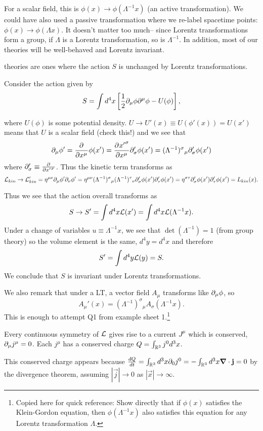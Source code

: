 For a scalar field, this is $\phi(x)\to \phi(\Lambda^{-1}x)$ (an active transformation). We could have also used a passive transformation where we re-label spacetime points: $\phi(x)\to \phi(\Lambda x)$. It doesn't matter too much-- since Lorentz transformations form a group, if $\Lambda$ is a Lorentz transformation, so is $\Lambda^{-1}$. In addition, most of our theories will be well-behaved and Lorentz invariant.

\begin{defn}
 theories are ones where the action $S$ is unchanged by Lorentz transformations.
\end{defn}

\begin{exm}
Consider the action given by
$$S=\int d^4x \left[\frac{1}{2} \partial_\mu \phi \partial^\mu \phi-U(\phi)\right],$$
\end{exm}
where $U(\phi)$ is some potential density. $U\to U'(x) \equiv U(\phi'(x))= U(x')$ means that $U$ is a scalar field (check this!) and we see that
$$\partial_\mu \phi' =\frac{\partial^{} }{\partial {x^\mu} ^{}}\phi(x')=\frac{\partial^{} {{x'}^\sigma}}{\partial {x^\mu} ^{}} \partial_\sigma' \phi(x')= (\Lambda^{-1})^\sigma{}_\mu \partial_\sigma' \phi(x')$$
where $\partial_\sigma' \equiv \frac{\partial^{} }{\partial {{x'}^\sigma} ^{}}$.
Thus the kinetic term transforms as
$$\mathcal L_{kin} \to \mathcal L_{kin}'=\eta^{\mu\nu}\partial_\mu \phi' \partial_\nu \phi' =\eta^{\mu\nu}(\Lambda^{-1})^\sigma{}_\mu (\Lambda^{-1})^\tau{}_\nu \partial_\sigma' \phi(x') \partial_\tau' \phi(x')=\eta^{\sigma\tau} \partial_\sigma' \phi(x')\partial_\tau' \phi(x') = L_{kin}(x).$$

Thus we see that the action overall transforms as
$$S\to S' = \int d^4 x \mathcal L(x')=\int d^4 x \mathcal L(\Lambda^{-1}x).$$
Under a change of variables $u \equiv \Lambda^{-1} x$, we see that $\det(\Lambda^{-1})=1$ (from group theory) so the volume element is the same, $d^4y=d^4x$ and therefore
$$S'=\int d^4 y \mathcal L(y)=S.$$
We conclude that $S$ is invariant under Lorentz transformations.

We also remark that under a LT, a vector field $A_\mu$ transforms like $\partial_\mu \phi$, so $$A_\mu'(x) = (\Lambda^{-1})^\sigma{}_\mu A_\sigma (\Lambda^{-1}x).$$
This is enough to attempt Q1 from example sheet 1.\footnote{Copied here for quick reference: Show directly that if $\phi(x)$ satisfies the Klein-Gordon equation, then $\phi(\Lambda^{-1} x)$ also satisfies this equation for any Lorentz transformation $\Lambda.$}

\begin{thm}
Every continuous symmetry of $\mathcal L$ gives rise to a current $J^\mu$ which is conserved, $\partial_\mu j^\mu=0$. Each $j^\mu$ has a conserved charge $Q=\int_{\mathbb{R}^3} j^0 d^3x$.

This conserved charge appears because $\frac{dQ}{dt}=\int_{\mathbb{R}^3} d^3x \partial_0 j^0  = -\int_{\mathbb{R}^3} d^3 x \mbox{\boldmath$ \nabla $} \cdot \boldsymbol{\mathbf{j}} =0$ by the divergence theorem, assuming $|\vec{j}|\to 0$ as $|\vec{x}|\to \infty$.
\end{thm}

